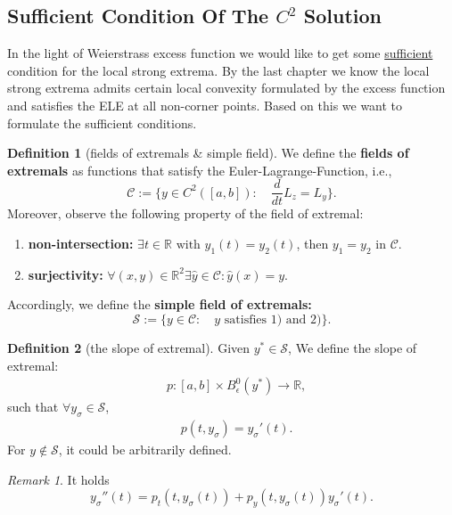 \documentclass[a4paper,11pt,fleqn]{book}
\theoremstyle{definition}
\newtheorem{definition}{Definition}[section]
\theoremstyle{remark}
\newtheorem*{remark}{Remark}
\begin{document}
\subsection{Sufficient Condition Of The $C^2$ Solution}

In the light of Weierstrass excess function we would like to get some \underline{sufficient} condition for the local strong extrema. By the last chapter we know the local strong extrema admits certain local convexity formulated by the excess function and  satisfies the ELE at all non-corner points. Based on this we want to formulate the sufficient conditions.
\begin{definition}[fields of extremals \& simple field]
	We define the \textbf{fields of extremals } as functions that satisfy the Euler-Lagrange-Function, i.e., 
	\begin{equation}
		\mathcal{C}:= \{ y \in C^2([a, b]): \quad \frac{d}{dt} L_z = L_y \}. 
	\end{equation}
	Moreover, observe the following property of the field of extremal:
	\begin{enumerate}
		\item \textbf{non-intersection:} $\exists t \in \mathbb{R} \text{ with } y_1(t) = y_2(t)$, then $y_1 = y_2$ in $\mathcal{C}$. 
		\item \textbf{surjectivity: }$\forall (x, y) \in \mathbb{R}^2 \exists \hat{y} \in \mathcal{C}: \hat{y}(x) = y$. 
	\end{enumerate}
	Accordingly, we define the \textbf{simple field of extremals:}
	\begin{equation}
		\mathcal{S}:= \{ y \in \mathcal{C}: \quad y \text{ satisfies 1) and 2)}\}. 
	\end{equation}
\end{definition}

\begin{definition}[the slope of extremal]
Given $y^* \in \mathcal{S}$, We define the slope of extremal:  
\begin{equation*}
\begin{aligned}
	& p:  [a, b] \times B_\epsilon^0(y^*) \rightarrow \mathbb{R}, 
\end{aligned}
\end{equation*}
such that $\forall y_\sigma \in \mathcal{S}$, 
\begin{align*}
	& p(t, y_\sigma) = y_\sigma'(t).
\end{align*}
For $y \notin \mathcal{S}$, it could be arbitrarily defined. 
\end{definition}
\begin{remark}
It holds
\begin{equation}
	y_\sigma''(t) = p_t(t, y_\sigma(t)) + p_y(t, y_\sigma(t))y_\sigma'(t). 
\end{equation}	
\end{remark}
\end{document}
